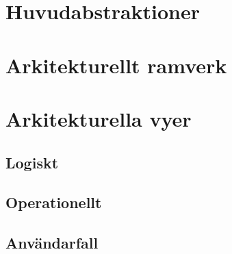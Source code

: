 \section{Huvudabstraktioner}
\section{Arkitekturellt ramverk}
\section{Arkitekturella vyer}
\subsection{Logiskt}
\subsection{Operationellt}
\subsection{Användarfall}

